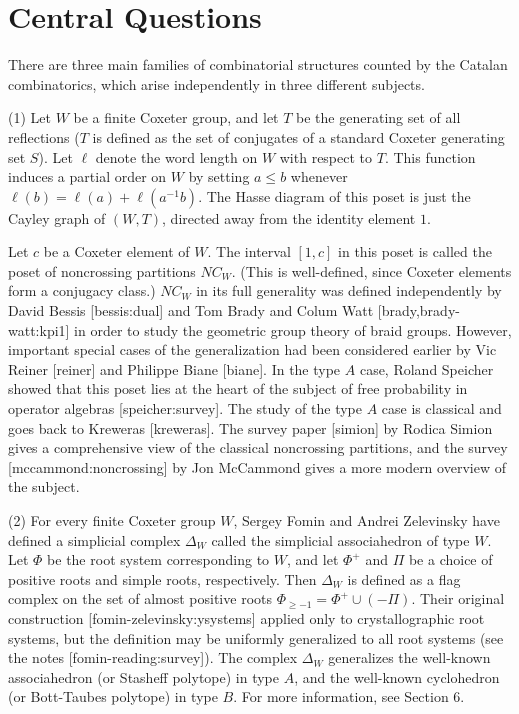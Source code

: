 \documentclass[12pt,letterpaper, reqno]{amsart}
\begin{document}
\section{Central Questions}

There are three main families of combinatorial structures counted by
the Catalan combinatorics, which arise independently in three different
subjects.


(1) Let $W$ be a finite Coxeter group, and let $T$ be the generating
set of all reflections ($T$ is defined as the set of conjugates of
a standard Coxeter generating set $S$). Let $\ell$ denote the word length
on $W$ with respect to $T$. This function induces a partial order on $W$
by setting $a\leq b$ whenever $\ell(b)=\ell(a)+\ell(a^{-1}b)$. The Hasse
diagram of this poset is just the Cayley graph of $(W,T)$, directed away
from the identity element $1$.

Let $c$ be a Coxeter element of $W$. The interval $[1,c]$ in
this poset is called the poset of noncrossing partitions
$NC_W$. (This is well-defined, since Coxeter elements form a conjugacy
class.) $NC_W$ in its full generality was defined independently
by David Bessis [bessis:dual] and Tom Brady and Colum Watt
[brady,brady-watt:kpi1] in order to study the geometric group theory
of braid groups. However, important special cases of the generalization
had been considered earlier by Vic Reiner [reiner] and Philippe Biane
[biane]. In the type $A$ case, Roland Speicher showed that this poset
lies at the heart of the subject of free probability in operator algebras
[speicher:survey]. The study of the type $A$ case is classical and
goes back to Kreweras [kreweras]. The survey paper [simion]
by Rodica Simion gives a comprehensive view of the classical noncrossing
partitions, and the survey [mccammond:noncrossing] by Jon McCammond
gives a more modern overview of the subject.

(2) For every finite Coxeter group $W$, Sergey Fomin and Andrei
Zelevinsky have defined a simplicial complex $\Delta_W$ called the
simplicial associahedron of type $W$. Let $\Phi$ be the root
system corresponding to $W$, and let $\Phi^+$ and $\Pi$ be a choice
of positive roots and simple roots, respectively. Then $\Delta_W$ is
defined as a flag complex on the set of  almost positive roots
$\Phi_{\geq -1}= \Phi^+ \cup (-\Pi)$. Their original construction
[fomin-zelevinsky:ysystems] applied only to crystallographic
root systems, but the definition may be uniformly generalized to all
root systems (see the notes [fomin-reading:survey]). The complex
$\Delta_W$ generalizes the well-known associahedron (or Stasheff polytope)
in type $A$, and the well-known cyclohedron (or Bott-Taubes polytope)
in type $B$. For more information, see Section 6.
\end{document}
